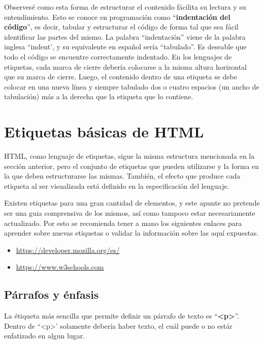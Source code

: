Observesé como esta forma de estructurar el contenido fácilita su lectura y
su entendimiento. Esto se conoce en programación como ``\textbf{indentación del
código}'', es decir, tabular y estructurar el código de forma tal que sea fácil
identificar las partes del mismo. La palabra ``indentación'' viene de la palabra
inglesa ``indent', y su equivalente en español sería ``tabulado''. Es deseable
que todo el código se encuentre correctamente indentado. En los lenguajes de
etiquetas, cada marca de cierre debería colocarse a la misma altura horizontal
que su marca de cierre. Luego, el contenido dentro de una etiqueta se debe colocar
en una nueva línea y siempre tabulado dos o cuatro espacios (un ancho de tabulación)
más a la derecha que la etiqueta que lo contiene.

\section{Etiquetas básicas de HTML}

HTML, como lenguaje de etiquetas, sigue la misma estructura mencionada en la
sección anterior, pero el conjunto de etiquetas que pueden utilizarse y la
forma en la que deben estructurarse las mismas. También, el efecto que produce
cada etiqueta al ser visualizada está definido en la especificación del lenguaje.

Existen etiquetas para una gran cantidad de elementos, y este apunte no pretende
ser una guia comprensiva de los mismos, así como tampoco estar necesariamente
actualizado. Por esto se recomienda tener a mano los siguientes enlaces para
aprender sobre nuevas etiquetas o validar la información sobre las aquí expuestas.

\begin{itemize}
    \item \href{https://developer.mozilla.org/es/}{https://developer.mozilla.org/es/}
    \item \href{https://www.w3schools.com}{https://www.w3schools.com}
\end{itemize}


\subsection*{Párrafos y énfasis}

La étiqueta más sencilla que permite definir un párrafo de texto es
``\textbf{<p>}''. Dentro de ``<p>' solamente debería haber texto, el cuál puede
o no estár enfatizado en algun lugar.

